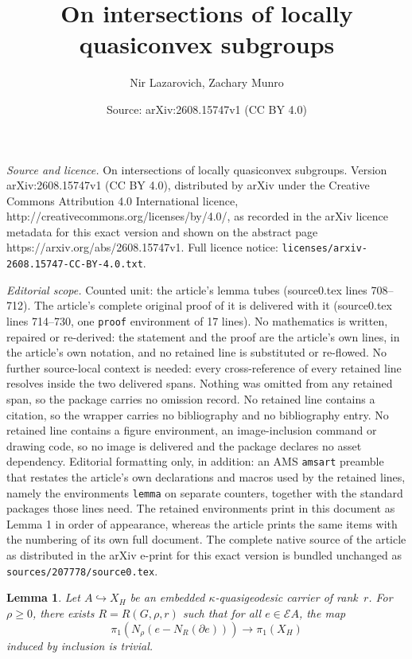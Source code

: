 \documentclass[10pt,a4paper]{amsart}
\title{On intersections of locally quasiconvex subgroups}
\author{Nir Lazarovich, Zachary Munro}
\date{Source: arXiv:2608.15747v1 (CC BY 4.0)}
\newtheorem{lemma}{Lemma}
\newcommand{\calE}{\mathcal{E}}
\begin{document}
\maketitle

\noindent\emph{Source and licence.} On intersections of locally quasiconvex subgroups. Version arXiv:2608.15747v1 (CC BY 4.0), distributed by arXiv under the Creative Commons Attribution 4.0 International licence, http://creativecommons.org/licenses/by/4.0/, as recorded in the arXiv licence metadata for this exact version and shown on the abstract page https://arxiv.org/abs/2608.15747v1. Full licence notice: \texttt{licenses/arxiv-2608.15747-CC-BY-4.0.txt}.\par\smallskip

\noindent\textit{Editorial scope.} Counted unit: the article's lemma tubes (source0.tex lines 708--712). The article's complete original proof of it is delivered with it (source0.tex lines 714--730, one \texttt{proof} environment of 17 lines). No mathematics is written, repaired or re-derived: the statement and the proof are the article's own lines, in the article's own notation, and no retained line is substituted or re-flowed.  No further source-local context is needed: every cross-reference of every retained line resolves inside the two delivered spans.  Nothing was omitted from any retained span, so the package carries no omission record.  No retained line contains a citation, so the wrapper carries no bibliography and no bibliography entry.  No retained line contains a figure environment, an image-inclusion command or drawing code, so no image is delivered and the package declares no asset dependency.  Editorial formatting only, in addition: an AMS \texttt{amsart} preamble that restates the article's own declarations and macros used by the retained lines, namely the environments \texttt{lemma} on separate counters, together with the standard packages those lines need.  The retained environments print in this document as Lemma 1 in order of appearance, whereas the article prints the same items with the numbering of its own full document.  The complete native source of the article as distributed in the arXiv e-print for this exact version is bundled unchanged as \texttt{sources/207778/source0.tex}.
\begin{lemma}\label{nullhomotopic tubes}
    Let $A\hookrightarrow X_H$ be an embedded $\kappa$-quasigeodesic carrier of rank~$r$. 
    For $\rho\ge 0$, there exists $R=R(G,\rho,r)$ such that for all $e\in \calE A$, the map 
    \[\pi_1(N_\rho(e-N_{R}(\partial e))) \to \pi_1(X_H)\]  induced by inclusion is trivial.
\end{lemma}
\end{document}
